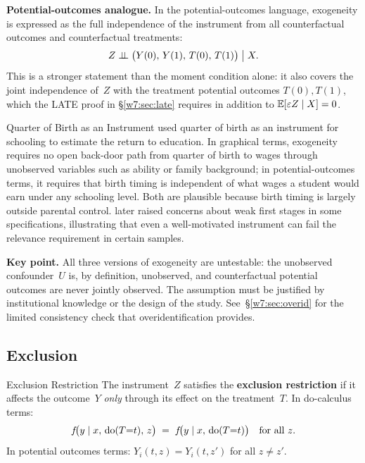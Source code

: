 \documentclass[master.tex]{subfiles}
\begin{document}
\noindent\textbf{Potential-outcomes analogue.}  In the
potential-outcomes language, exogeneity is expressed as the full
independence of the instrument from all counterfactual outcomes and
counterfactual treatments:
\[
  Z \perp\!\!\!\perp \bigl(Y(0),\, Y(1),\, T(0),\, T(1)\bigr) \;\big|\; X.
\]
This is a stronger statement than the moment condition alone: it
also covers the joint independence of~$Z$ with the treatment
potential outcomes $T(0), T(1)$, which the LATE proof in
\S\ref{w7:sec:late} requires in addition to
$\mathbb{E}[\varepsilon Z \mid X] = 0$.

\begin{example}{Quarter of Birth as an Instrument}
\label{w7:ex:qob}
\citet{angrist1991does} used quarter of birth as an instrument
for schooling to estimate the return to education.  In graphical
terms, exogeneity requires no open back-door path from quarter of
birth to wages through unobserved variables such as ability or
family background; in potential-outcomes terms, it requires that
birth timing is independent of what wages a student would earn
under any schooling level.  Both are plausible because birth timing
is largely outside parental control.  \citet{bound1995problems}
later raised concerns about weak first stages in some
specifications, illustrating that even a well-motivated instrument
can fail the relevance requirement in certain samples.
\end{example}

\noindent\textbf{Key point.}  All three versions of exogeneity
are untestable: the unobserved confounder~$U$ is, by definition,
unobserved, and counterfactual potential outcomes are never jointly
observed.  The assumption must be justified by institutional
knowledge or the design of the study.
See~\S\ref{w7:sec:overid} for the limited consistency check that
overidentification provides.

\subsection{Exclusion}

\begin{defn}{Exclusion Restriction}
\label{w7:defn:exclusion}
The instrument~$Z$ satisfies the \textbf{exclusion restriction} if
it affects the outcome~$Y$ \emph{only} through its effect on the
treatment~$T$.  In do-calculus terms:
\[
  f\!\bigl(y \mid x,\, \mathrm{do}(T{=}t),\, z\bigr)
  \;=\;
  f\!\bigl(y \mid x,\, \mathrm{do}(T{=}t)\bigr)
  \quad \text{for all } z.
\]
In potential outcomes terms: $Y_i(t, z) = Y_i(t, z')$ for all
$z \neq z'$.
\end{defn}
\end{document}
